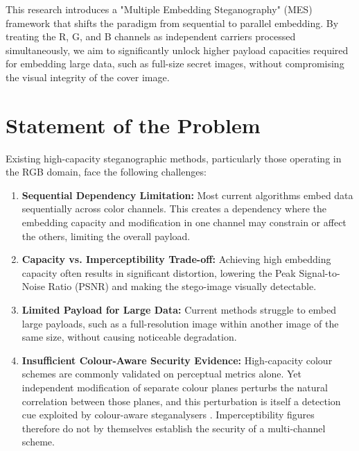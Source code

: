 This research introduces a "Multiple Embedding Steganography" (MES) framework that shifts the paradigm from sequential to parallel embedding. By treating the R, G, and B channels as independent carriers processed simultaneously, we aim to significantly unlock higher payload capacities required for embedding large data, such as full-size secret images, without compromising the visual integrity of the cover image.

\section{Statement of the Problem}
Existing high-capacity steganographic methods, particularly those operating in the RGB domain, face the following challenges:
\begin{enumerate}
    \item \textbf{Sequential Dependency Limitation:} Most current algorithms embed data sequentially across color channels. This creates a dependency where the embedding capacity and modification in one channel may constrain or affect the others, limiting the overall payload.
    \item \textbf{Capacity vs. Imperceptibility Trade-off:} Achieving high embedding capacity often results in significant distortion, lowering the Peak Signal-to-Noise Ratio (PSNR) and making the stego-image visually detectable.
    \item \textbf{Limited Payload for Large Data:} Current methods struggle to embed large payloads, such as a full-resolution image within another image of the same size, without causing noticeable degradation.
    \item \textbf{Insufficient Colour-Aware Security Evidence:} High-capacity colour schemes are commonly validated on perceptual metrics alone. Yet independent modification of separate colour planes perturbs the natural correlation between those planes, and this perturbation is itself a detection cue exploited by colour-aware steganalysers \citep{amrutha2023rgbsteganalysis}. Imperceptibility figures therefore do not by themselves establish the security of a multi-channel scheme.
\end{enumerate}

